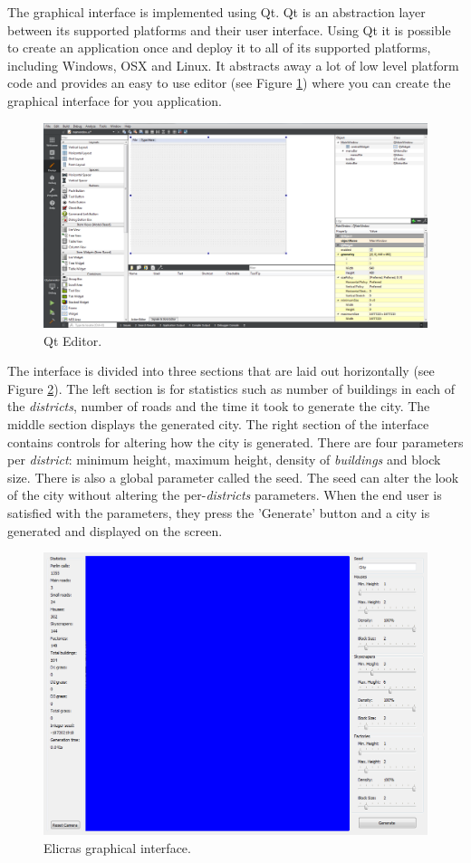 	\par
	The graphical interface is implemented using Qt\cite{QtWebpage}. Qt is an abstraction layer between its supported platforms and their user interface. Using Qt it is possible to create an application once and deploy it to all of its supported platforms, including Windows, OSX and Linux. It abstracts away a lot of low level platform code and provides an easy to use editor (see Figure \ref{fig:qt-editor}) where you can create the graphical interface for you application\cite{Win32Programming}\cite{QtProgramming}.
		
	\begin{figure}[h]
		\centering
		\includegraphics[width=0.7\linewidth]{"Images/Qt"}
		\caption{Qt Editor.}
		\label{fig:qt-editor}
	\end{figure}
		
	\par
	The interface is divided into three sections that are laid out horizontally (see Figure \ref{fig:elicras-interface}). The left section is for statistics such as number of buildings in each of the \textit{districts}, number of roads and the time it took to generate the city. The middle section displays the generated city. The right section of the interface contains controls for altering how the city is generated. There are four parameters per \textit{district}: minimum height, maximum height, density of \textit{buildings} and block size. There is also a global parameter called the seed. The seed can alter the look of the city without altering the per-\textit{districts} parameters. When the end user is satisfied with the parameters, they press the 'Generate' button and a city is generated and displayed on the screen.
		
	\begin{figure}[h]
		\centering
		\includegraphics[width=0.5\linewidth]{"Images/interface"}
		\caption{Elicras graphical interface.}
		\label{fig:elicras-interface}
	\end{figure}
	
